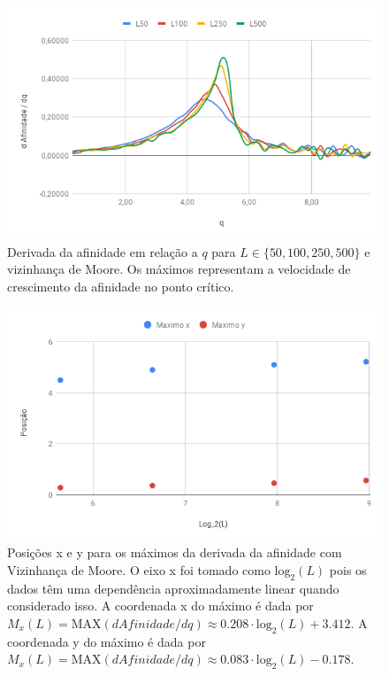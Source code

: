 \documentclass[12pt,a4paper,final]{article}
\begin{document}
  \begin{figure}[h]
    \centering
    \includegraphics[width=.7\linewidth]{MooreDerivadaAfinidade.png}
    \caption{Derivada da afinidade em relação a $q$ para $L\in\{50, 100, 250, 500\}$ e vizinhança de Moore. Os máximos representam a velocidade de crescimento da afinidade no ponto crítico.}
    \label{fig:MooreDerivadaAfinidade}
  \end{figure}

  \begin{figure}[h]
    \centering
    \includegraphics[width=.7\linewidth]{MooreMaximosDerivada.png}
    \caption{Posições x e y para os máximos da derivada da afinidade com Vizinhança de Moore. O eixo x foi tomado como $\mathrm{log_2}(L)$ pois os dados têm uma dependência aproximadamente linear quando considerado isso. A coordenada x do máximo é dada por $M_{x}(L) = \mathrm{MAX}(d Afinidade / dq) \approx 0.208\cdot\mathrm{log_2}(L)+3.412$. A coordenada y do máximo é dada por $M_{x}(L) = \mathrm{MAX}(d Afinidade / dq) \approx 0.083\cdot\mathrm{log_2}(L)-0.178$.}
    \label{fig:MooreMaximosDerivada}
  \end{figure}
\end{document}
